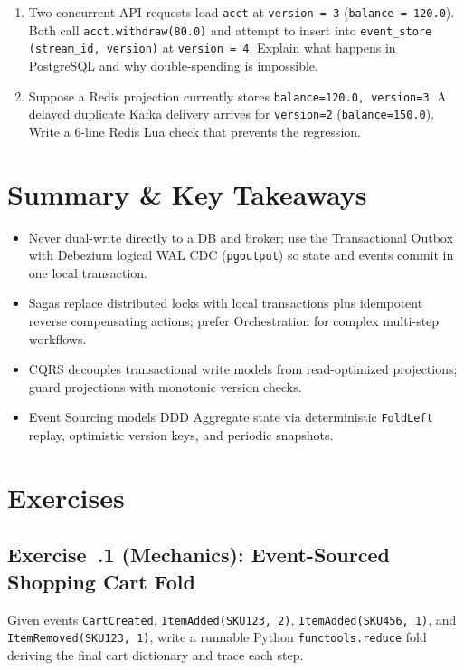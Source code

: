 \begin{tryityourselfbox}
\begin{enumerate}[leftmargin=18pt]
  \item Two concurrent API requests load \texttt{acct} at \texttt{version = 3} (\texttt{balance = 120.0}). Both call \texttt{acct.withdraw(80.0)} and attempt to insert into \texttt{event\_store (stream\_id, version)} at \texttt{version = 4}. Explain what happens in PostgreSQL and why double-spending is impossible.
  \item Suppose a Redis projection currently stores \texttt{balance=120.0, version=3}. A delayed duplicate Kafka delivery arrives for \texttt{version=2} (\texttt{balance=150.0}). Write a 6-line Redis Lua check that prevents the regression.
\end{enumerate}
\end{tryityourselfbox}

\section{Summary \protect\& Key Takeaways}
\begin{itemize}[leftmargin=18pt]
  \item Never dual-write directly to a DB and broker; use the Transactional Outbox with Debezium logical WAL CDC (\texttt{pgoutput}) so state and events commit in one local transaction.
  \item Sagas replace distributed locks with local transactions plus idempotent reverse compensating actions; prefer Orchestration for complex multi-step workflows.
  \item CQRS decouples transactional write models from read-optimized projections; guard projections with monotonic version checks.
  \item Event Sourcing models DDD Aggregate state via deterministic \texttt{FoldLeft} replay, optimistic version keys, and periodic snapshots.
\end{itemize}

\section{Exercises}

\subsection*{Exercise~\thechapter.1 (Mechanics): Event-Sourced Shopping Cart Fold}
Given events \texttt{CartCreated}, \texttt{ItemAdded(SKU123, 2)}, \texttt{ItemAdded(SKU456, 1)}, and \texttt{ItemRemoved(SKU123, 1)}, write a runnable Python \texttt{functools.reduce} fold deriving the final cart dictionary and trace each step.

